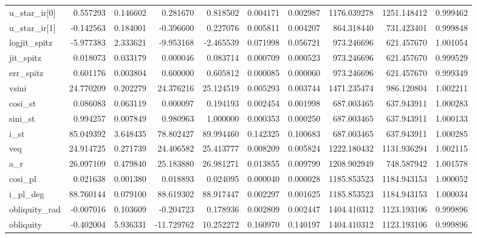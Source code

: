 \begin{tabular}{lrrrrrrrrr}
u\_star\_ir[0]  &    0.557293 &    0.146602 &    0.281670 &     0.818502 &   0.004171 &  0.002987 &  1176.039278 &  1251.148412 &  0.999462 \\
u\_star\_ir[1]  &   -0.142563 &    0.184001 &   -0.396600 &     0.227076 &   0.005811 &  0.004207 &   864.318440 &   731.423401 &  0.999848 \\
logjit\_spitz  &   -5.977383 &    2.333621 &   -9.953168 &    -2.465539 &   0.071998 &  0.056721 &   973.246696 &   621.457670 &  1.001054 \\
jit\_spitz     &    0.018073 &    0.033179 &    0.000046 &     0.083714 &   0.000709 &  0.000523 &   973.246696 &   621.457670 &  0.999529 \\
err\_spitz     &    0.601176 &    0.003804 &    0.600000 &     0.605812 &   0.000085 &  0.000060 &   973.246696 &   621.457670 &  0.999349 \\
vsini         &   24.770209 &    0.202279 &   24.376216 &    25.124519 &   0.005293 &  0.003744 &  1471.235474 &   986.120804 &  1.002211 \\
cosi\_st       &    0.086083 &    0.063119 &    0.000097 &     0.194193 &   0.002454 &  0.001998 &   687.003465 &   637.943911 &  1.000283 \\
sini\_st       &    0.994257 &    0.007849 &    0.980963 &     1.000000 &   0.000353 &  0.000250 &   687.003465 &   637.943911 &  1.000133 \\
i\_st          &   85.049392 &    3.648435 &   78.802427 &    89.994460 &   0.142325 &  0.100683 &   687.003465 &   637.943911 &  1.000285 \\
veq           &   24.914725 &    0.271739 &   24.406582 &    25.413777 &   0.008209 &  0.005824 &  1222.180432 &  1131.936294 &  1.002115 \\
a\_r           &   26.097109 &    0.479840 &   25.183880 &    26.981271 &   0.013855 &  0.009799 &  1208.902949 &   748.587942 &  1.001578 \\
cosi\_pl       &    0.021638 &    0.001380 &    0.018893 &     0.024095 &   0.000040 &  0.000028 &  1185.853523 &  1184.943153 &  1.000052 \\
i\_pl\_deg      &   88.760144 &    0.079100 &   88.619302 &    88.917447 &   0.002297 &  0.001625 &  1185.853523 &  1184.943153 &  1.000034 \\
obliquity\_rad &   -0.007016 &    0.103609 &   -0.204723 &     0.178936 &   0.002809 &  0.002447 &  1404.410312 &  1123.193106 &  0.999896 \\
obliquity     &   -0.402004 &    5.936331 &  -11.729762 &    10.252272 &   0.160970 &  0.140197 &  1404.410312 &  1123.193106 &  0.999896 \\
\bottomrule
\end{tabular}
